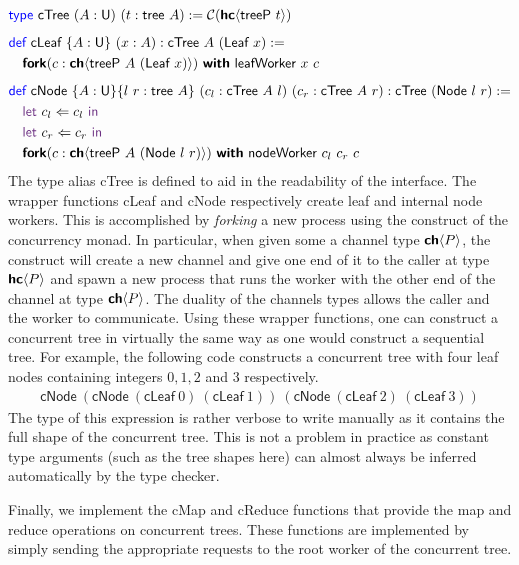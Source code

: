 \vspace{-1em}
\begingroup
\small
\addtolength{\jot}{-0.2em}
\begin{align*}
  &\Type\ \textsf{cTree}\ (A : \Un)\ (t : \textsf{tree}\ A) := \CM{\HC{\textsf{treeP}\ t}}
  \\[0.5em]
  &\Def\ \textsf{cLeaf}\ \{A : \Un\}\ (x : A) : \textsf{cTree}\ A\ (\textsf{Leaf}\ x) := \\
  &\quad\Fork(c : \CH{\textsf{treeP}\ A\ (\textsf{Leaf}\ x)})\ \With\ \textsf{leafWorker}\ x\ c
  \\[0.5em]
  &\Def\ \textsf{cNode}\ \{A : \Un\} \{l\ r : \textsf{tree}\ A\}\ (c_l : \textsf{cTree}\ A\ l)\ (c_r : \textsf{cTree}\ A\ r) : \textsf{cTree}\ (\textsf{Node}\ l\ r) := \\
  &\quad\Let\ c_l \Leftarrow c_l\ \In \\
  &\quad\Let\ c_r \Leftarrow c_r\ \In \\
  &\quad\Fork(c : \CH{\textsf{treeP}\ A\ (\textsf{Node}\ l\ r)})\ \With\ \textsf{nodeWorker}\ c_l\ c_r\ c
\end{align*}
\endgroup
The type alias \textsf{cTree} is defined to aid in the readability of the interface.
The wrapper functions \textsf{cLeaf} and \textsf{cNode} respectively create leaf
and internal node workers. This is accomplished by \emph{forking} a new process using
the \Fork{} construct of the concurrency monad. In particular, when given some a channel type
${\textbf{\textsf{ch}}\langle{P}\rangle}$, the \Fork{} construct will create a new channel and give one end of it to the caller
at type ${\textbf{\textsf{hc}}\langle{P}\rangle}$ and spawn a new process that runs the worker with the other end of the channel
at type ${\textbf{\textsf{ch}}\langle{P}\rangle}$. The duality of the channels types allows the caller and the worker to communicate.
Using these wrapper functions, one can construct a concurrent tree in virtually the same way
as one would construct a sequential tree. For example, the following code constructs a
concurrent tree with four leaf nodes containing integers $0, 1, 2$ and
$3$ respectively.
\begin{align*}
  \textsf{cNode}\ (\textsf{cNode}\ (\textsf{cLeaf}\ 0)\ (\textsf{cLeaf}\ 1))\ (\textsf{cNode}\ (\textsf{cLeaf}\ 2)\ (\textsf{cLeaf}\ 3))
\end{align*}
The type of this expression is rather verbose to write manually as it contains the full shape
of the concurrent tree. This is not a problem in practice as constant type arguments
(such as the tree shapes here) can almost always be inferred automatically by the type checker.

Finally, we implement the \textsf{cMap} and \textsf{cReduce} functions that provide the
map and reduce operations on concurrent trees. These functions are implemented by
simply sending the appropriate requests to the root worker of the concurrent tree.


